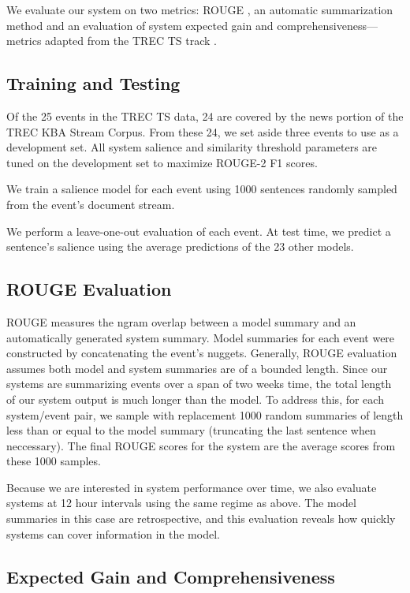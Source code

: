 We evaluate our system on two metrics: ROUGE \cite{lin2004rouge}, an automatic
summarization method and an evaluation of system expected gain and 
comprehensiveness---metrics adapted from the TREC TS track 
\cite{aslam2013trec}.


\subsection{Training and Testing}


Of the 25 events in the TREC TS data, 24 are covered by the news portion of 
the TREC KBA Stream Corpus. From these 24, we set aside three events to use as
a development set. All system salience and similarity threshold parameters are
tuned on the development set to maximize ROUGE-2 F1 scores.


We train a salience model for each event using 1000 sentences randomly sampled
from the event's document stream. 


We perform a leave-one-out evaluation of each event. At test time, we predict 
a sentence's salience using the average predictions of the 23 other models.   


\subsection{ROUGE Evaluation}


ROUGE measures the ngram overlap between a model summary and an automatically 
generated system summary. Model summaries for each event were constructed by 
concatenating the event's nuggets. Generally, ROUGE evaluation assumes both 
model and system summaries are of a bounded length. Since our systems are 
summarizing events over a span of two weeks time, the total length of our 
system output is much longer than the model. To address this, for each 
system/event pair, we sample with replacement 1000 random summaries of length 
less than or equal to the model summary (truncating the last sentence when 
neccessary). The final ROUGE scores for the system are the average scores 
from these 1000 samples.


Because we are interested in system performance over time, we also evaluate 
systems at 12 hour intervals using the same regime as above. The model 
summaries in this case are retrospective, and this evaluation reveals how 
quickly systems can cover  information in the model.


\subsection{Expected Gain and Comprehensiveness}



